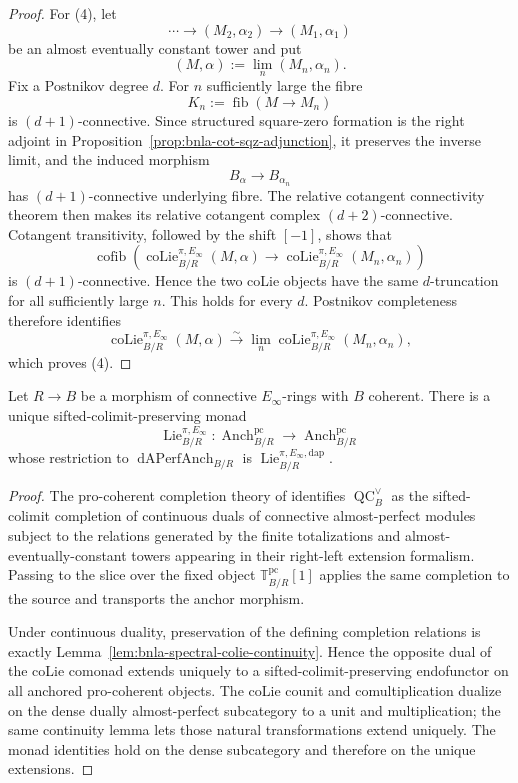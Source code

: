 \begin{proof}
For (4), let
\[
    \cdots\longrightarrow(M_2,\alpha_2)
    \longrightarrow(M_1,\alpha_1)
\]
be an almost eventually constant tower and put
\[
    (M,\alpha):=\lim_n(M_n,\alpha_n).
\]
Fix a Postnikov degree $d$.  For $n$ sufficiently large the fibre
\[
    K_n:=\operatorname{fib}(M\to M_n)
\]
is $(d+1)$-connective.  Since structured square-zero formation is the right
adjoint in Proposition~\ref{prop:bnla-cot-sqz-adjunction}, it preserves the
inverse limit, and the induced morphism
\[
    B_\alpha\longrightarrow B_{\alpha_n}
\]
has $(d+1)$-connective underlying fibre.  The relative cotangent connectivity
theorem then makes its relative cotangent complex $(d+2)$-connective.
Cotangent transitivity, followed by the shift $[-1]$, shows that
\[
    \operatorname{cofib}
    \left(
        \operatorname{coLie}^{\pi,E_\infty}_{B/R}(M,\alpha)
        \longrightarrow
        \operatorname{coLie}^{\pi,E_\infty}_{B/R}(M_n,\alpha_n)
    \right)
\]
is $(d+1)$-connective.  Hence the two coLie objects have the same
$d$-truncation for all sufficiently large $n$.  This holds for every $d$.
Postnikov completeness therefore identifies
\[
    \operatorname{coLie}^{\pi,E_\infty}_{B/R}(M,\alpha)
    \xrightarrow{\sim}
    \lim_n
    \operatorname{coLie}^{\pi,E_\infty}_{B/R}(M_n,\alpha_n),
\]
which proves (4).
\end{proof}

\begin{theorem}
\label{thm:bnla-spectral-lie-algebroid-monad}
Let $R\to B$ be a morphism of connective $E_\infty$-rings with $B$ coherent.
There is a unique sifted-colimit-preserving monad
\[
\boxed{
    \operatorname{Lie}^{\pi,E_\infty}_{B/R}:
    \operatorname{Anch}^{\mathrm{pc}}_{B/R}
    \longrightarrow
    \operatorname{Anch}^{\mathrm{pc}}_{B/R}}
\]
whose restriction to $\operatorname{dAPerfAnch}_{B/R}$ is
$\operatorname{Lie}^{\pi,E_\infty,\mathrm{dap}}_{B/R}$.
\end{theorem}

\begin{proof}
The pro-coherent completion theory of
\cite{BrantnerCamposNuiten2025} identifies
$\operatorname{QC}^{\vee}_B$ as the sifted-colimit completion of continuous
duals of connective almost-perfect modules subject to the relations generated
by the finite totalizations and almost-eventually-constant towers appearing
in their right-left extension formalism.  Passing to the slice over the fixed
object $\mathbb T^{\mathrm{pc}}_{B/R}[1]$ applies the same completion to the
source and transports the anchor morphism.

Under continuous duality, preservation of the defining completion relations
is exactly Lemma~\ref{lem:bnla-spectral-colie-continuity}.  Hence the opposite
dual of the coLie comonad extends uniquely to a sifted-colimit-preserving
endofunctor on all anchored pro-coherent objects.  The coLie counit and
comultiplication dualize on the dense dually almost-perfect subcategory to a
unit and multiplication; the same continuity lemma lets those natural
transformations extend uniquely.  The monad identities hold on the dense
subcategory and therefore on the unique extensions.
\end{proof}

